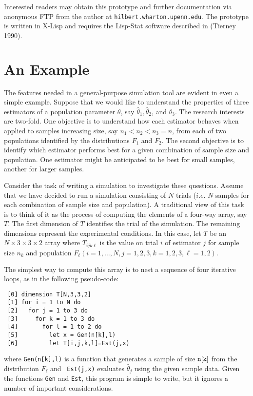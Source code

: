 Interested readers may obtain this prototype and further documentation
via anonymous FTP from the author at {\tt hilbert.wharton.upenn.edu}.
The prototype is written in X-Lisp and requires the Lisp-Stat software
described in (Tierney 1990).   



\section{An Example}

The features needed in a general-purpose simulation tool are evident
in even a simple example. Suppose that we would like to understand
the properties of three estimators of a population parameter
$\theta$, say $\hat\theta_1, \hat\theta_2$, and $\hat\theta_3$.  The
research interests are two-fold.  One objective is to understand how
each estimator behaves when applied to samples increasing size, say
$n_1 < n_2 < n_3 = n$, from each of two populations identified by
the distributions $F_1$ and  $F_2$.  The second objective is to
identify which estimator performs best for a given combination of
sample size and population.  One estimator might be anticipated to be
best for small samples, another for larger samples.

Consider the task of writing a simulation to investigate these
questions. Assume that we have decided to run a simulation consisting
of $N$ trials ($i.e.$ $N$ samples for each combination of sample size
and population).  A traditional view of this task is to think of it as
the process of computing the elements of a four-way array, say $T$. 
The first dimension of $T$ identifies the trial of the simulation. The
remaining dimensions represent the experimental conditions.  In this
case, let $T$ be an $N \times 3 \times 3 \times 2$ array where
$T_{ijk\ell}$ is the value on trial $i$ of estimator $j$ for sample
size $n_k$ and population $F_{\ell} (i=1,\ldots,N, j = 1,2,3,k =
1,2,3,\ell=1,2)$.

The simplest way to compute this array is to nest a sequence of four
iterative loops, as in the following pseudo-code:
\begin{verbatim}
 [0] dimension T[N,3,3,2]
 [1] for i = 1 to N do
 [2]   for j = 1 to 3 do
 [3]     for k = 1 to 3 do
 [4]       for l = 1 to 2 do
 [5]         let x = Gen(n[k],l)
 [6]         let T[i,j,k,l]=Est(j,x)
\end{verbatim}
where {\tt Gen(n[k],l)} is a function that generates a sample of
size ${\tt n[k]}$ from the distribution $F_{\ell}$ and {\tt
Est(j,x)} evaluates $\hat\theta_j$ using the given sample data. Given
the functions {\tt Gen} and {\tt Est}, this program is simple to write,
but it ignores a number of important considerations.


